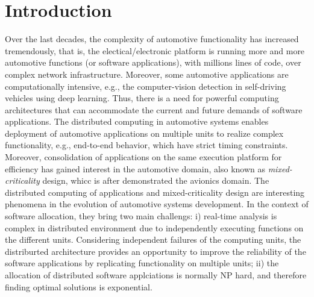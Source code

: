 \section{Introduction}
Over the last decades, the complexity of automotive functionality has increased tremendously, that is, the electical/electronic platform is running more and more automotive functions (or software applications), with millions lines of code, over complex network infrastructure. Moreover, some automotive applications are computationally intensive, e.g., the computer-vision detection in self-driving vehicles using deep learning. Thus, there is a need for powerful computing architectures that can accommodate the current and future demands of software applications. The distributed computing in automotive systems enables deployment of automotive applications on multiple units to realize complex functionality, e.g., end-to-end behavior, which have strict timing constraints. Moreover, consolidation of applications on the same execution platform for efficiency has gained interest in the automotive domain, also known as \textit{mixed-criticality} design, whicc is after demonstrated the avionics domain. The distributed computing of applications and mixed-criticality design are interesting phenomena in the evolution of automotive systems development. In the context of software allocation, they bring two main challengs: i) real-time analysis is complex in distributed environment due to independently executing functions on the different units. Considering independent failures of the computing units, the distriburted architecture provides an opportunity to improve the reliability of the software applications by replicating functionality on multiple units; ii) the allocation of distributed software applciations is normally NP hard, and therefore finding optimal solutions is exponential. %

